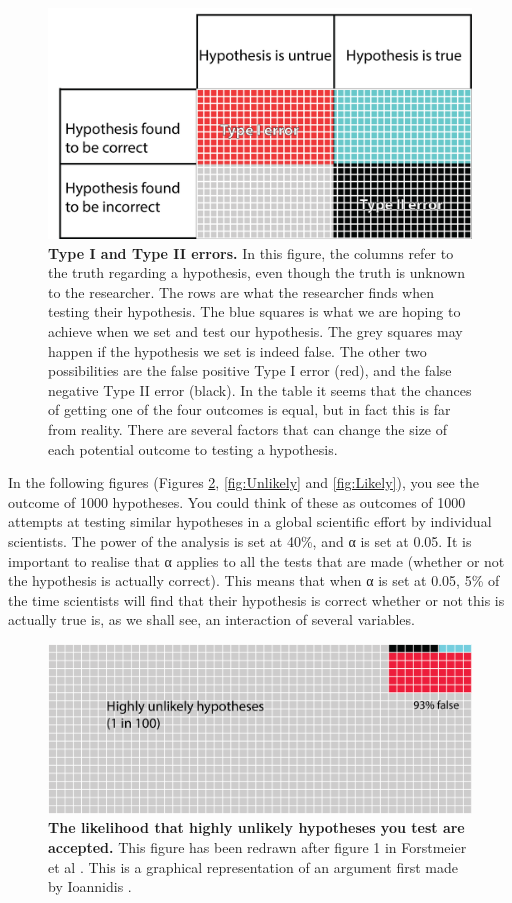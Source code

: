 \documentclass[
]{krantz}
\begin{document}
\begin{figure}
\includegraphics[width=0.9\linewidth]{figures/TypeITypeII} \caption{\textbf{Type I and Type II errors.} In this figure, the columns refer to the truth regarding a hypothesis, even though the truth is unknown to the researcher. The rows are what the researcher finds when testing their hypothesis. The blue squares is what we are hoping to achieve when we set and test our hypothesis. The grey squares may happen if the hypothesis we set is indeed false. The other two possibilities are the false positive Type I error (red), and the false negative Type II error (black). In the table it seems that the chances of getting one of the four outcomes is equal, but in fact this is far from reality. There are several factors that can change the size of each potential outcome to testing a hypothesis.}\label{fig:TypeITypeII}
\end{figure}

In the following figures (Figures \ref{fig:HighlyUnlikely}, \ref{fig:Unlikely} and \ref{fig:Likely}), you see the outcome of 1000 hypotheses. You could think of these as outcomes of 1000 attempts at testing similar hypotheses in a global scientific effort by individual scientists. The power of the analysis is set at 40\%, and α is set at 0.05. It is important to realise that α applies to all the tests that are made (whether or not the hypothesis is actually correct). This means that when α is set at 0.05, 5\% of the time scientists will find that their hypothesis is correct whether or not this is actually true is, as we shall see, an interaction of several variables.



\begin{figure}
\includegraphics[width=0.9\linewidth]{figures/HighlyUnlikely} \caption{\textbf{The likelihood that highly unlikely hypotheses you test are accepted.} This figure has been redrawn after figure 1 in Forstmeier et al \citeyearpar{forstmeier2017detecting}. This is a graphical representation of an argument first made by Ioannidis \citeyearpar{ioannidis2005why}.}\label{fig:HighlyUnlikely}
\end{figure}
\end{document}
